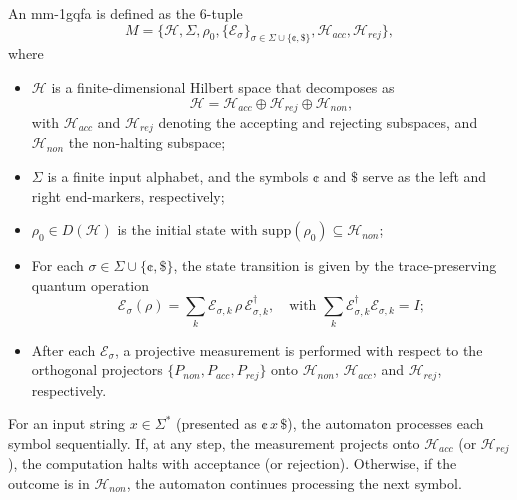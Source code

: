 \begin{definition}
An \gls{mm-1gqfa} is defined as the 6-tuple
\[
M = \{ \mathcal{H},\Sigma,\rho_0,\{\mathcal{E}_\sigma\}_{\sigma\in\Sigma\cup\{\cent,\$\}},\mathcal{H}_{acc},\mathcal{H}_{rej}\},
\]
where
\begin{itemize}
  \item $\mathcal{H}$ is a finite-dimensional Hilbert space that decomposes as
  \[
  \mathcal{H}=\mathcal{H}_{acc}\oplus \mathcal{H}_{rej}\oplus \mathcal{H}_{non},
  \]
  with $\mathcal{H}_{acc}$ and $\mathcal{H}_{rej}$ denoting the accepting and rejecting subspaces, and $\mathcal{H}_{non}$ the non-halting subspace;
  \item $\Sigma$ is a finite input alphabet, and the symbols $\cent$ and $\$$ serve as the left and right end-markers, respectively;
  \item $\rho_0\in D(\mathcal{H})$ is the initial state with $\mathrm{supp}(\rho_0)\subseteq \mathcal{H}_{non}$;
  \item For each $\sigma\in\Sigma\cup\{\cent,\$\}$, the state transition is given by the trace-preserving quantum operation 
  \[
  \mathcal{E}_\sigma(\rho)=\sum_{k} \mathcal{E}_{\sigma,k}\,\rho\,\mathcal{E}_{\sigma,k}^\dagger,\quad \text{with } \sum_{k} \mathcal{E}_{\sigma,k}^\dagger \mathcal{E}_{\sigma,k}=I;
  \]
  \item After each $\mathcal{E}_\sigma$, a projective measurement is performed with respect to the orthogonal projectors $\{P_{non},P_{acc},P_{rej}\}$ onto $\mathcal{H}_{non}$, $\mathcal{H}_{acc}$, and $\mathcal{H}_{rej}$, respectively.
\end{itemize}
\end{definition}

For an input string $x\in\Sigma^*$ (presented as $\cent\,x\,\$$), the automaton processes each symbol sequentially. If, at any step, the measurement projects onto $\mathcal{H}_{acc}$ (or $\mathcal{H}_{rej}$), the computation halts with acceptance (or rejection). Otherwise, if the outcome is in $\mathcal{H}_{non}$, the automaton continues processing the next symbol.

